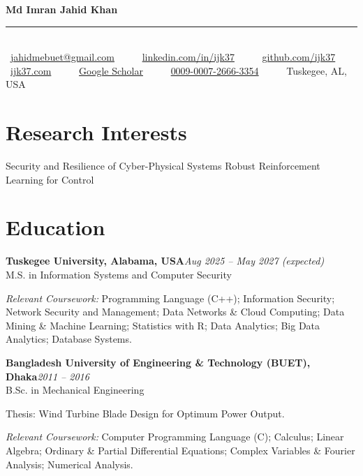 \documentclass[10pt,letterpaper]{article}
\newcommand{\position}[3]{%
  \textbf{#1}\hfill{\color{muted}\textit{#2}}\\
  {\color{dark}#3}\par\vspace{1pt}}
\begin{document}
\enlargethispage{12pt}

{\centering
  {\fontsize{20}{22}\selectfont\bfseries\color{dark} Md Imran Jahid Khan}\\[1pt]
  {\color{accent2}\rule{1.4in}{1.2pt}}\\[1pt]
  {\small
    \faEnvelope~\href{mailto:jahidmebuet@gmail.com}{jahidmebuet@gmail.com}~~\textbullet~~
    \phoneline
    \faLinkedin~\href{https://www.linkedin.com/in/ijk37/}{linkedin.com/in/ijk37}~~\textbullet~~
    \faGithub~\href{https://github.com/ijk37}{github.com/ijk37}\\[1pt]
    \faGlobe~\href{https://ijk37.com}{ijk37.com}~~\textbullet~~
    \faGraduationCap~\href{https://scholar.google.com/citations?user=5VQULPEAAAAJ\&hl=en}{Google Scholar}~~\textbullet~~
    \faOrcid~\href{https://orcid.org/0009-0007-2666-3354}{0009-0007-2666-3354}~~\textbullet~~
    \faMapMarker~Tuskegee, AL, USA
  }\par}

\section{Research Interests}
Security and Resilience of Cyber-Physical Systems \textbullet{} Robust Reinforcement Learning for Control

\section{Education}
\position{Tuskegee University, Alabama, USA}{Aug 2025 -- May 2027 (expected)}
{M.S. in Information Systems and Computer Security\mastersgrade}
{\small\color{muted}\textit{Relevant Coursework:} Programming Language (C++); Information Security; Network Security and Management;
Data Networks \& Cloud Computing; Data Mining \& Machine Learning; Statistics with R; Data Analytics; Big Data Analytics;
Database Systems.\par}
\vspace{3pt}
\position{Bangladesh University of Engineering \& Technology (BUET), Dhaka}{2011 -- 2016}
{B.Sc. in Mechanical Engineering\bachelorsgrade}
{\small\color{muted}Thesis: Wind Turbine Blade Design for Optimum Power Output.\par
\textit{Relevant Coursework:} Computer Programming Language (C); Calculus; Linear Algebra; Ordinary \& Partial Differential Equations;
Complex Variables \& Fourier Analysis; Numerical Analysis.\par}
\end{document}
